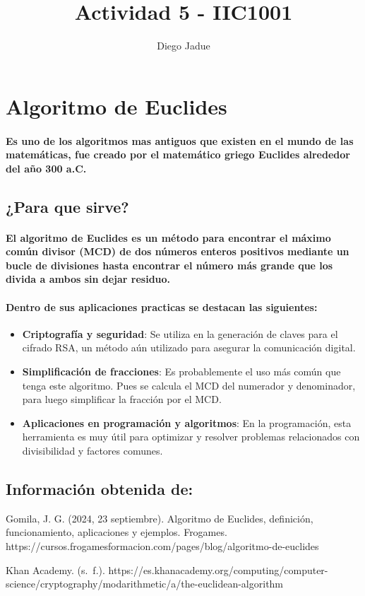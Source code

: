 \documentclass{article}
\title{\textbf{Actividad 5 - IIC1001}}
\author{Diego Jadue}
\begin{document}
\maketitle

\section{Algoritmo de Euclides}
\paragraph{Es uno de los algoritmos mas antiguos que existen en el mundo de las matemáticas, fue creado por el matemático griego Euclides alrededor del año 300 a.C. }

\subsection{¿Para que sirve?}
\paragraph{El algoritmo de Euclides es un método para encontrar el máximo común divisor (MCD) de dos números enteros positivos mediante un bucle de divisiones hasta encontrar el número más grande que los divida a ambos sin dejar residuo.}

\paragraph{Dentro de sus aplicaciones practicas se destacan las siguientes:}
\begin{itemize}
    \item \textbf{Criptografía y seguridad}: Se utiliza en la generación de claves para el cifrado RSA, un método aún utilizado para asegurar la comunicación digital.
    
    \item \textbf{Simplificación de fracciones}: Es probablemente el uso más común que tenga este algoritmo. Pues se calcula el MCD del numerador y denominador, para luego simplificar la fracción por el MCD.
    
    \item \textbf{Aplicaciones en programación y algoritmos}: En la programación, esta herramienta es muy útil para optimizar y resolver problemas relacionados con divisibilidad y factores comunes.
\end{itemize}

\subsection{Información obtenida de:}

\textrm{
Gomila, J. G. (2024, 23 septiembre). Algoritmo de Euclides, definición, funcionamiento, aplicaciones y ejemplos. 
Frogames. \newline
https://cursos.frogamesformacion.com/pages/blog/algoritmo-de-euclides}

\textrm{ Khan Academy. (s. f.). https://es.khanacademy.org/computing/computer-science/cryptography/modarithmetic/a/the-euclidean-algorithm}
\end{document}
